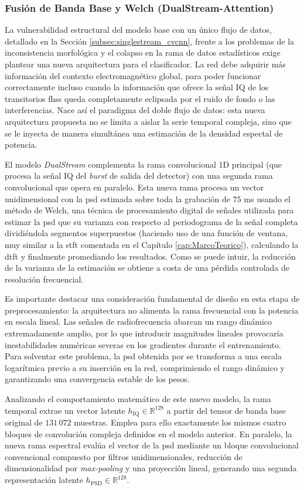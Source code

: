 \subsubsection{Fusión de Banda Base y Welch (DualStream-Attention)}
La vulnerabilidad estructural del modelo base con un único flujo de datos, detallado en la Sección \ref{subsec:singlestream_cvcnn}, frente a los problemas de la inconsistencia morfológica y el colapso en la rama de datos estadísticos exige plantear una nueva arquitectura para el clasificador. La red debe adquirir más información del contexto electromagnético global, para poder funcionar correctamente incluso cuando la información que ofrece la señal IQ de los transitorios \gls{fhss} queda completamente eclipsada por el ruido de fondo o las interferencias. Nace así el paradigma del doble flujo de datos: esta nueva arquitectura propuesta no se limita a aislar la serie temporal compleja, sino que se le inyecta de manera simultánea una estimación de la densidad espectal de potencia. 

El modelo \textit{DualStream} complementa la rama convolucional 1D principal (que procesa la señal IQ del \textit{burst} de salida del detector) con una segunda rama convolucional que opera en paralelo. Esta nueva rama procesa un vector unidimensional con la \gls{psd} estimada sobre toda la grabación de $75$ ms usando el método de Welch, una técnica de procesamiento digital de señales utilizada para estimar la \gls{psd} que su varianza con respecto al periodograma de la señal completa dividiéndola segmentos superpuestos (haciendo uso de una función de ventana, muy similar a la \gls{stft} comentada en el Capítulo \ref{cap:MarcoTeorico}), calculando la \gls{dtft} y finalmente promediando los resultados. Como se puede intuir, la reducción de la varianza de la estimación se obtiene a costa de una pérdida controlada de resolución frecuencial.

Es importante destacar una consideración fundamental de diseño en esta etapa de preprocesamiento: la arquitectura no alimenta la rama frecuencial con la potencia en escala lineal. Las señales de radiofrecuencia abarcan un rango dinámico extremadamente amplio, por lo que introducir magnitudes lineales provocaría inestabilidades numéricas severas en los gradientes durante el entrenamiento. Para solventar este problema, la \gls{psd} obtenida por se transforma a una escala logarítmica previo a su inserción en la red, comprimiendo el rango dinámico y garantizando una convergencia estable de los pesos.

Analizando el comportamiento matemático de este nuevo modelo, la rama temporal extrae un vector latente $h_{\text{IQ}} \in \mathbb{R}^{128}$ a partir del tensor de banda base original de $131\,072$ muestras. Emplea para ello exactamente los mismos cuatro bloques de convolución compleja definidos en el modelo anterior. En paralelo, la nueva rama espectral evalúa el vector de la \gls{psd} mediante un bloque convolucional convencional compuesto por filtros unidimensionales, reducción de dimensionalidad por \textit{max-pooling} y una proyección lineal, generando una segunda representación latente $h_{\text{PSD}} \in \mathbb{R}^{128}$.

